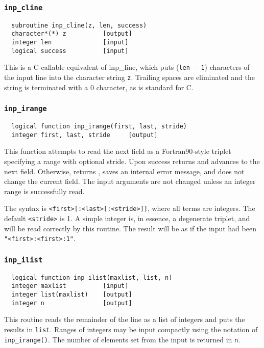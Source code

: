 \subsubsection{{\tt inp\_cline}}
\begin{verbatim}
  subroutine inp_cline(z, len, success)
  character*(*) z          [output]
  integer len              [input]
  logical success          [input]
\end{verbatim}
This is a C-callable equivalent of inp\_line, which puts ({\tt len - 1}) characters of
the input line into the character string {\tt z}. Trailing spaces are
eliminated and the string is terminated with a 0 character, as is
standard for C.


\subsubsection{{\tt inp\_irange}}
\begin{verbatim}
  logical function inp_irange(first, last, stride)
  integer first, last, stride     [output]
\end{verbatim}
This function attempts to read the next field as a Fortran90-style triplet specifying
a range with optional stride.  Upon success returns \TRUE and
advances to the next field.  Otherwise, returns \FALSE, saves an
internal error message, and does not change the current field.  The
input arguments are not changed unless an integer range is
successfully read.

The syntax is \verb+<first>[:<last>[:<stride>]]+, where all terms are
integers.  The default \verb+<stride>+ is 1.  A simple integer is, in
essence, a degenerate triplet, and will be read correctly by this
routine.  The result will be as if the input had been
\verb+"<first>:<first>:1"+.

\subsubsection{{\tt inp\_ilist}}
\begin{verbatim}
  logical function inp_ilist(maxlist, list, n)
  integer maxlist          [input]
  integer list(maxlist)    [output]
  integer n                [output]
\end{verbatim}
This routine reads the remainder of the line as a list of integers and puts the
results in {\tt list}.  Ranges of integers may be input compactly
using the notation of \verb+inp_irange()+. The number of elements set
from the input is returned in \verb+n+.

